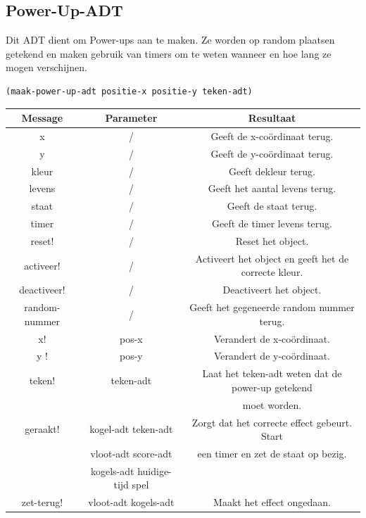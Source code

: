 \documentclass[]{article}
\begin{document}
\subsection{Power-Up-ADT}
Dit ADT dient om Power-ups aan te maken. Ze worden op random plaatsen getekend en maken gebruik van timers om te weten wanneer en hoe lang ze mogen verschijnen.
\begin{center}
	\begin{lstlisting}
(maak-power-up-adt positie-x positie-y teken-adt)
	\end{lstlisting}
	\begin{tabular}{|c|c|c|}
		\hline  \textbf{Message} &\textbf{Parameter} & \textbf{Resultaat}  \\
		\hline x & /&Geeft de x-co\"{o}rdinaat terug. \\
		\hline y & /&Geeft de y-co\"{o}rdinaat terug. \\
		\hline kleur & /&Geeft dekleur terug. \\
		\hline levens & /&Geeft het aantal levens terug. \\
		\hline staat & /&Geeft de staat terug. \\
		\hline timer & /&Geeft de timer levens terug. \\
		\hline reset! & /&Reset het object. \\
		\hline activeer! & /&Activeert het object en geeft het de correcte kleur. \\
		\hline deactiveer! & /&Deactiveert het object. \\
		\hline random-nummer & /&Geeft het gegeneerde random nummer terug. \\
		\hline x! & pos-x &Verandert de x-co\"{o}rdinaat. \\
		\hline y !& pos-y &Verandert de y-co\"{o}rdinaat. \\
		\hline  teken! &teken-adt& Laat het teken-adt weten dat de power-up getekend  \\ &&moet worden. \\
		\hline geraakt! & kogel-adt teken-adt &  Zorgt dat het correcte effect gebeurt. Start \\
								& vloot-adt score-adt & een timer en zet de staat op bezig. \\
								&kogels-adt huidige-tijd spel & \\
		\hline zet-terug! &vloot-adt kogels-adt & Maakt het effect ongedaan. \\
		\hline 
	\end{tabular}
\end{center}
\end{document}
